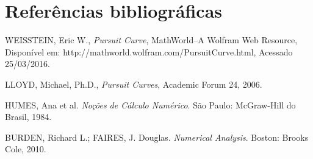 \documentclass[a4paper,10pt]{article}
\begin{document}
  
  \section{Referências bibliográficas}
  

  \begin{thebibliography}{9}
      WEISSTEIN, Eric W.,
      \emph{Pursuit Curve},
      MathWorld--A Wolfram Web Resource,
      Disponível em: http://mathworld.wolfram.com/PursuitCurve.html,
      Acessado 25/03/2016.

      LLOYD, Michael, Ph.D.,
      \emph{Pursuit Curves},
      Academic Forum 24,
      2006.
      
      HUMES, Ana et al. \emph{Noções de Cálculo Numérico}. São Paulo: McGraw-Hill do Brasil, 1984.
     
      BURDEN, Richard L.; FAIRES, J. Douglas. \emph{Numerical Analysis}. Boston: Brooks Cole, 2010.  
     
     
     

  \end{thebibliography}
\end{document}
